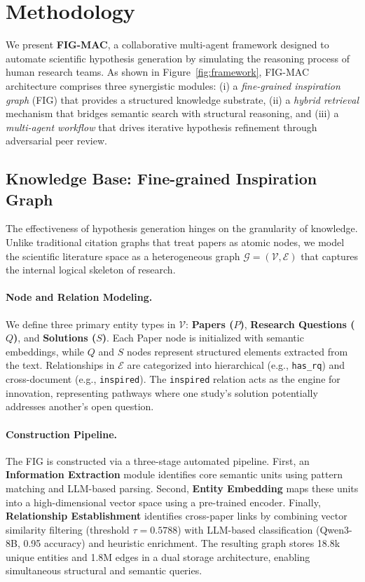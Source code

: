 \section{Methodology}
\label{sec:methodology}

We present \textbf{FIG-MAC}, a collaborative multi-agent framework designed to automate scientific hypothesis generation by simulating the reasoning process of human research teams. As shown in Figure~\ref{fig:framework}, FIG-MAC architecture comprises three synergistic modules: (i) a \emph{fine-grained inspiration graph} (FIG) that provides a structured knowledge substrate, (ii) a \emph{hybrid retrieval} mechanism that bridges semantic search with structural reasoning, and (iii) a \emph{multi-agent workflow} that drives iterative hypothesis refinement through adversarial peer review.

\subsection{Knowledge Base: Fine-grained Inspiration Graph}
\label{sec:graph_construction}

The effectiveness of hypothesis generation hinges on the granularity of knowledge. Unlike traditional citation graphs that treat papers as atomic nodes, we model the scientific literature space as a heterogeneous graph $\mathcal{G} = (\mathcal{V}, \mathcal{E})$ that captures the internal logical skeleton of research.

\paragraph{Node and Relation Modeling.}
We define three primary entity types in $\mathcal{V}$: \textbf{Papers ($P$)}, \textbf{Research Questions ($Q$)}, and \textbf{Solutions ($S$)}. Each Paper node is initialized with semantic embeddings, while $Q$ and $S$ nodes represent structured elements extracted from the text. Relationships in $\mathcal{E}$ are categorized into hierarchical (e.g., \texttt{has\_rq}) and cross-document (e.g., \texttt{inspired}). The \texttt{inspired} relation acts as the engine for innovation, representing pathways where one study's solution potentially addresses another's open question.

\paragraph{Construction Pipeline.}
The FIG is constructed via a three-stage automated pipeline. First, an \textbf{Information Extraction} module identifies core semantic units using pattern matching and LLM-based parsing. Second, \textbf{Entity Embedding} maps these units into a high-dimensional vector space using a pre-trained encoder. Finally, \textbf{Relationship Establishment} identifies cross-paper links by combining vector similarity filtering (threshold $\tau = 0.5788$) with LLM-based classification (Qwen3-8B, 0.95 accuracy) and heuristic enrichment. The resulting graph stores 18.8k unique entities and 1.8M edges in a dual storage architecture, enabling simultaneous structural and semantic queries.


